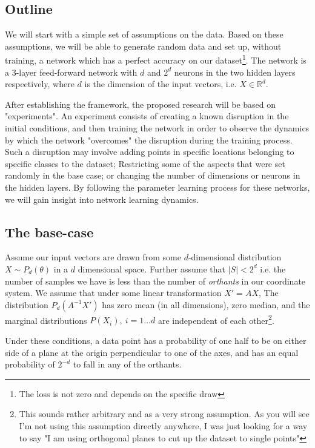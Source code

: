 \documentclass[]{article}
\begin{document}
	\subsection{Outline}
		We will start with a simple set of assumptions on the data. Based on these assumptions, we will be able to generate random data and set up, without training, a network which has a perfect accuracy on our dataset\footnote{The loss is not zero and depends on the specific draw}. The network is a 3-layer feed-forward network with $d$ and $2^d$ neurons in the two hidden layers respectively, where $d$ is the dimension of the input vectors, i.e. $X \in \mathbb{R}^d$. 
		
		After establishing the framework, the proposed research will be based on "experiments". An experiment consists of creating a known disruption in the initial conditions, and then training the network in order to observe the dynamics by which the network "overcomes" the disruption during the training process. Such a disruption may involve adding points in specific locations belonging to specific classes to the dataset; Restricting some of the aspects that were set randomly in the base case; or changing the number of dimensions or neurons in the hidden layers. By following the parameter learning process for these networks, we will gain insight into network learning dynamics.
		
		
 	\subsection{The base-case}
 		Assume our input vectors are drawn from some $d$-dimensional distribution $X\sim P_d(\theta
 		)$ in a $d$ dimensional space. Further assume that $|S| < 2^d$ i.e. the number of samples we have is less than the number of \emph{orthants} in our coordinate system. We assume that under some linear transformation $X'=AX$, The distribution $P_d(A^{-1}X')$ has zero mean (in all dimensions), zero median, and the marginal distributions $P(X_i),\ i=1\ldots d$ are independent of each other\footnote{This sounds rather arbitrary and as a very strong assumption. As you will see I'm not using this assumption directly anywhere, I was just looking for a way to say "I am using orthogonal planes to cut up the dataset to single points"}.
 		
 		Under these conditions, a data point has a probability of one half to be on either side of a plane at the origin perpendicular to one of the axes, and has an equal probability of $2^{-d}$ to fall in any of the orthants.
\end{document}
